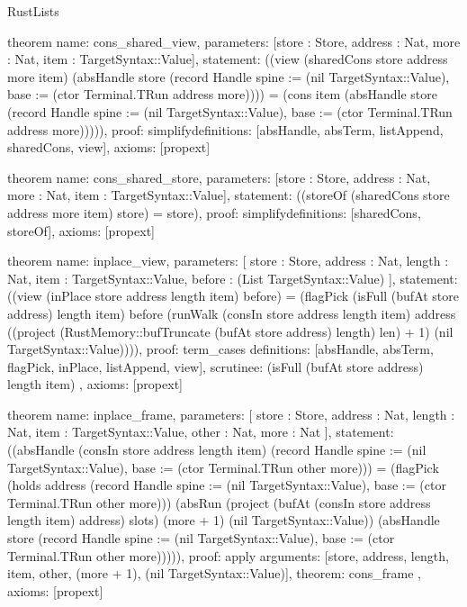 \begin{lexlean}{RustLists}
\begin{semanticmodule}
theorem{
  name: cons_shared_view,
  parameters: [store : Store, address : Nat, more : Nat, item : TargetSyntax::Value],
  statement: ((view (sharedCons store address more item) (absHandle store (record Handle {spine := (nil TargetSyntax::Value), base := (ctor Terminal.TRun address more)}))) = (cons item (absHandle store (record Handle {spine := (nil TargetSyntax::Value), base := (ctor Terminal.TRun address more)})))),
  proof: simplify{definitions: [absHandle, absTerm, listAppend, sharedCons, view]},
  axioms: [propext]
}

theorem{
  name: cons_shared_store,
  parameters: [store : Store, address : Nat, more : Nat, item : TargetSyntax::Value],
  statement: ((storeOf (sharedCons store address more item) store) = store),
  proof: simplify{definitions: [sharedCons, storeOf]},
  axioms: [propext]
}

theorem{
  name: inplace_view,
  parameters: [
    store : Store,
    address : Nat,
    length : Nat,
    item : TargetSyntax::Value,
    before : (List TargetSyntax::Value)
  ],
  statement: ((view (inPlace store address length item) before) = (flagPick (isFull (bufAt store address) length item) before (runWalk (consIn store address length item) address ((project (RustMemory::bufTruncate (bufAt store address) length) len) + 1) (nil TargetSyntax::Value)))),
  proof: term_cases{
    definitions: [absHandle, absTerm, flagPick, inPlace, listAppend, view],
    scrutinee: (isFull (bufAt store address) length item)
  },
  axioms: [propext]
}

theorem{
  name: inplace_frame,
  parameters: [
    store : Store,
    address : Nat,
    length : Nat,
    item : TargetSyntax::Value,
    other : Nat,
    more : Nat
  ],
  statement: ((absHandle (consIn store address length item) (record Handle {spine := (nil TargetSyntax::Value), base := (ctor Terminal.TRun other more)})) = (flagPick (holds address (record Handle {spine := (nil TargetSyntax::Value), base := (ctor Terminal.TRun other more)})) (absRun (project (bufAt (consIn store address length item) address) slots) (more + 1) (nil TargetSyntax::Value)) (absHandle store (record Handle {spine := (nil TargetSyntax::Value), base := (ctor Terminal.TRun other more)})))),
  proof: apply{
    arguments: [store, address, length, item, other, (more + 1), (nil TargetSyntax::Value)],
    theorem: cons_frame
  },
  axioms: [propext]
}


\end{semanticmodule}
\end{lexlean}
